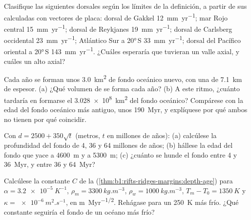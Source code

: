 \begin{exercise}[$\star$]\label{exo:b1:rifts-ridges-margins:3}
Clasifique las siguientes dorsales según los límites de la definición, a partir de sus  calculadas con
vectores de placa: dorsal de Gakkel \qty{12}{mm.yr^{-1}}; mar Rojo central \qty{15}{mm.yr^{-1}}; dorsal de Reykjanes
\qty{19}{mm.yr^{-1}}; dorsal de Carlsberg occidental \qty{23}{mm.yr^{-1}}; Atlántico Sur a \ang{20}\,S \qty{33}{mm.yr^{-1}}; dorsal del
Pacífico oriental a \ang{20}\,S \qty{143}{mm.yr^{-1}}. ¿Cuáles esperaría que tuvieran un valle axial, y cuáles un alto axial?
\end{exercise}

\begin{exercise}[$\star$]\label{exo:b1:rifts-ridges-margins:4}
Cada año se forman unos \qty{3.0}{km^2} de fondo oceánico nuevo, con una  de \qty{7.1}{km} de espesor. (a) ¿Qué volumen de  se
forma cada año? (b) A este ritmo, ¿cuánto tardaría en formarse el \qty{3.028e8}{km^2} del fondo oceánico? Compárese con la edad del fondo
oceánico más antiguo, unos \qty{190}{Myr}, y explíquese por qué ambos no tienen por qué coincidir.
\end{exercise}

\begin{exercise}[$\star\star$]\label{exo:b1:rifts-ridges-margins:5}
Con $d = 2500 + 350\sqrt t$ (metros, $t$ en millones de años): (a) calcúlese la profundidad del fondo de 4, 36 y 64 millones de años;
(b) hállese la edad del fondo que yace a \qty{4600}{m} y a \qty{5300}{m}; (c) ¿cuánto se hunde el fondo entre 4 y \qty{36}{Myr}, y entre
36 y \qty{64}{Myr}?
\end{exercise}

\begin{exercise}[$\star\star$]\label{exo:b1:rifts-ridges-margins:6}
Calcúlese la constante $C$ de la 
(\cref{thm:b1:rifts-ridges-margins:depth-age}) para $\alpha =
\qty{3.2e-5}{K^{-1}}$, $\rho_m = \qty{3300}{kg.m^{-3}}$, $\rho_w =
\qty{1000}{kg.m^{-3}}$, $T_m - T_0 = \qty{1350}{K}$ y $\kappa =
\qty{e-6}{m^2.s^{-1}}$, en \unit{m.Myr^{-1/2}}. Rehágase para un 
\qty{250}{K} más frío. ¿Qué constante seguiría el fondo de un océano más frío?
\end{exercise}


